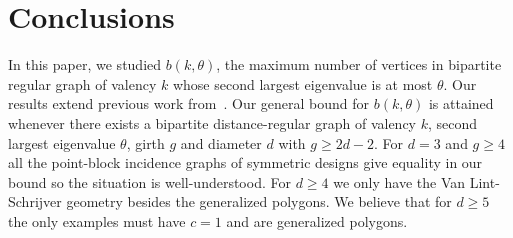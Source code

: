 \documentclass[ALCO,ThmDefs,Unicode,epreuves]{cedram}
\begin{document}
\section{Conclusions}\label{sec:conclusions}

In this paper, we studied $b(k,\theta)$, the maximum number of vertices in bipartite regular graph of valency $k$ whose second largest eigenvalue is at most $\theta$. Our results extend previous work from~\cite{CKNV16, HJ12, HJ14, CLS96,TY00}. Our general bound for $b(k,\theta)$ is attained whenever there exists a bipartite distance-regular graph of valency $k$, second largest eigenvalue $\theta$, girth $g$ and diameter $d$ with $g\geq 2d-2$. For $d=3$ and $g \geq 4$ all the point-block incidence graphs of symmetric designs give equality in our bound so the situation is well-understood. For $d\geq 4$ we only have the Van Lint-Schrijver geometry besides the generalized polygons. We believe that for $d \geq 5$ the only examples must have $c=1$ and are generalized polygons.

 

\nocite{*}


\end{document}
